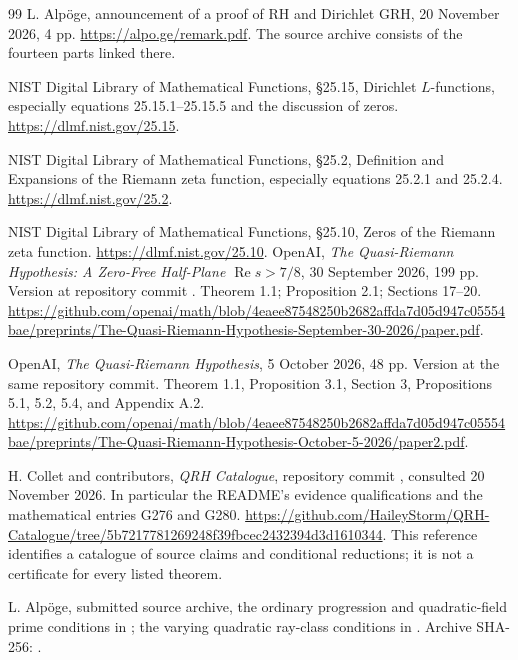 \begin{thebibliography}{99}
L. Alp\"oge, announcement of a proof of RH and Dirichlet GRH,
20 November 2026, 4 pp.
\url{https://alpo.ge/remark.pdf}.
The source archive consists of the fourteen parts linked there.

NIST Digital Library of Mathematical Functions,
\S25.15, Dirichlet $L$-functions, especially equations
25.15.1--25.15.5 and the discussion of zeros.
\url{https://dlmf.nist.gov/25.15}.

NIST Digital Library of Mathematical Functions,
\S25.2, Definition and Expansions of the Riemann zeta function,
especially equations 25.2.1 and 25.2.4.
\url{https://dlmf.nist.gov/25.2}.

NIST Digital Library of Mathematical Functions,
\S25.10, Zeros of the Riemann zeta function.
\url{https://dlmf.nist.gov/25.10}.
OpenAI, \emph{The Quasi-Riemann Hypothesis: A Zero-Free Half-Plane
$\operatorname{Re}s>7/8$}, 30 September 2026, 199 pp.
Version at repository commit
.
Theorem 1.1; Proposition 2.1; Sections 17--20.
\url{https://github.com/openai/math/blob/4eaee87548250b2682affda7d05d947c05554bae/preprints/The-Quasi-Riemann-Hypothesis-September-30-2026/paper.pdf}.

OpenAI, \emph{The Quasi-Riemann Hypothesis}, 5 October 2026,
48 pp. Version at the same repository commit.
Theorem 1.1, Proposition 3.1, Section 3, Propositions 5.1, 5.2,
5.4, and Appendix A.2.
\url{https://github.com/openai/math/blob/4eaee87548250b2682affda7d05d947c05554bae/preprints/The-Quasi-Riemann-Hypothesis-October-5-2026/paper2.pdf}.

H. Collet and contributors, \emph{QRH Catalogue}, repository
commit ,
consulted 20 November 2026. In particular the README's evidence
qualifications and the mathematical entries G276 and G280.
\url{https://github.com/HaileyStorm/QRH-Catalogue/tree/5b7217781269248f39fbcec2432394d3d1610344}.
This reference identifies a catalogue of source claims and
conditional reductions; it is not a certificate for every
listed theorem.

L. Alp\"oge, submitted source archive, the ordinary progression
and quadratic-field prime conditions in
;
the varying quadratic ray-class conditions in
.
Archive SHA-256:
.


\end{thebibliography}
